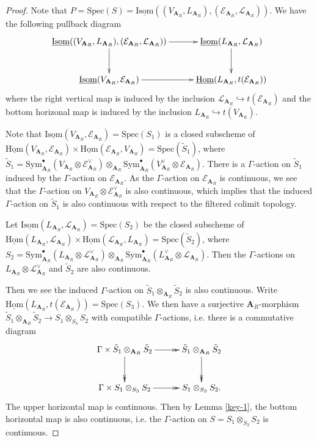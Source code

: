 \documentclass[10pt]{article}
\numberwithin{equation}{section}
\newcommand{\calE}{{\mathcal E}}
\newcommand{\calL}{{\mathcal L}}
\newcommand{\Hom}{{\mathrm{Hom}}}           %
\newcommand{\Isom}{{\mathrm{Isom}}}         %
\newcommand{\Spec}{{\mathrm{Spec}}}         %
\newcommand{\Sym}{{\mathrm{Sym}}}           %
\newcommand{\bfA}{{\textbf{A}}}
\begin{document}
\begin{proof}
    Note that $P=\Spec(S)=\underline\Isom((V_{\bfA_R},L_{\bfA_R}),(\calE_{\bfA_R},\calL_{\bfA_R}))$. We have the following pullback diagram
    \begin{equation}\label{Diagram-5}
        \xymatrix@=1cm{
        \underline\Isom((V_{\bfA_R},L_{\bfA_R}),(\calE_{\bfA_R},\calL_{\bfA_R}))\ar[d]\ar[r] & \underline\Isom(L_{\bfA_R},\calL_{\bfA_R})\ar[d]\\
        \underline\Isom(V_{\bfA_R},\calE_{\bfA_R})\ar[r] & \underline\Hom(L_{\bfA_R},t(\calE_{\bfA_R}))
        }
    \end{equation}
    where the right vertical map is induced by the inclusion $\calL_{\bfA_R}\hookrightarrow t(\calE_{\bfA_R})$ and the bottom horizonal map is induced by the inclusion $L_{\bfA_R}\hookrightarrow t(V_{\bfA_R})$.

   Note that $\underline\Isom(V_{\bfA_R},\calE_{\bfA_R})=\Spec(S_1)$ is a closed subscheme of $\underline\Hom(V_{\bfA_R},\calE_{\bfA_R})\times \underline\Hom(\calE_{\bfA_R},V_{\bfA_R})=\Spec(\tilde S_1)$, where $\tilde S_1=\Sym_{\bfA_R}^{\bullet}(V_{\bfA_R}\otimes \calE_{\bfA_R}^{\vee})\otimes_{\bfA_R}\Sym_{\bfA_R}^{\bullet}(V_{\bfA_R}^\vee\otimes \calE_{\bfA_R})$. There is a $\Gamma$-action on $\tilde S_1$ induced by the $\Gamma$-action on $\calE_{\bfA_R}$. As the $\Gamma$-action on $\calE_{\bfA_R}$ is continuous, we see that the $\Gamma$-action on $V_{\bfA_R}\otimes \calE_{\bfA_R}^{\vee}$ is also continuous, which implies that the induced $\Gamma$-action on $\tilde S_1$ is also continuous with respect to the filtered colimit topology. 
   
   Let $\underline\Isom(L_{\bfA_R},\calL_{\bfA_R})=\Spec(S_2)$ be the closed subscheme of $\underline\Hom(L_{\bfA_R},\calL_{\bfA_R})\times \underline\Hom(\calL_{\bfA_R},L_{\bfA_R})=\Spec(\tilde S_2)$, where $S_2=\Sym_{\bfA_R}^{\bullet}(L_{\bfA_R}\otimes \calL_{\bfA_R}^{\vee})\otimes_{\bfA_R}\Sym_{\bfA_R}^{\bullet}(L_{\bfA_R}^{\vee}\otimes \calL_{\bfA_R})$. Then the $\Gamma$-actions on $L_{\bfA_R}\otimes \calL_{\bfA_R}^{\vee}$ and $\tilde S_2$ are also continuous. 

   Then we see the induced $\Gamma$-action on $\tilde S_1\otimes_{\bfA_R}\tilde S_2$ is also continuous. Write $\underline\Hom(L_{\bfA_R},t(\calE_{\bfA_R}))=\Spec(S_3)$. We then have a surjective $\bfA_R$-morphism $\tilde S_1\otimes_{\bfA_R}\tilde S_2\to S_1\otimes_{S_3}S_2$ with compatible $\Gamma$-actions, i.e. there is a commutative diagram
   \begin{equation}
       \xymatrix@=1cm{
       \Gamma\times \tilde S_1\otimes_{\bfA_R}\tilde S_2\ar@{->>}[d]\ar@{->>}[r] & \tilde S_1\otimes_{\bfA_R}\tilde S_2\ar@{->>}[d] \\
       \Gamma \times S_1\otimes_{S_3}S_2\ar@{->>}[r] & S_1\otimes_{S_3}S_2.
       }
   \end{equation}
  The upper horizontal map is continuous. Then by Lemma \ref{key-1}, the bottom horizontal map is also continuous, i.e. the $\Gamma$-action on $S=S_1\otimes_{S_3}S_2$ is continuous.


\end{proof}
\end{document}
